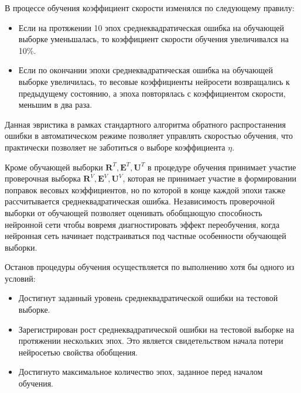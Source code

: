 
В процессе обучения коэффициент скорости изменялся по следующему правилу:
\begin{itemize}
\item Если на протяжении 10 эпох среднеквадратическая ошибка на
  обучающей выборке уменьшалась, то коэффициент скорости обучения
  увеличивался на 10\%.
\item Если по окончании эпохи среднеквадратическая ошибка на обучающей
  выборке увеличилась, то весовые коэффициенты нейросети возвращались
  к предыдущему состоянию, а эпоха повторялась с коэффициентом
  скорости, меньшим в два раза.
\end{itemize}
Данная эвристика в рамках стандартного алгоритма обратного
распростанения ошибки в автоматическом режиме позволяет управлять
скоростью обучения, что практически позволяет не заботиться о выборе
коэффициента $\eta$.

Кроме обучающей выборки $\mathbf{R}^T,\mathbf{E}^T,\mathbf{U}^T$ в
процедуре обучения принимает участие проверочная выборка
$\mathbf{R}^V,\mathbf{E}^V,\mathbf{U}^V$, которая не принимает участие
в формировании поправок весовых коэффициентов, но по которой в конце
каждой эпохи также рассчитывается среднеквадратическая ошибка.
Независимость проверочной выборки от обучающей позволяет оценивать
обобщающую способность нейронной сети чтобы вовремя диагностировать
эффект переобучения, когда нейронная сеть начинает подстраиваться под
частные особенности обучающей выборки.

Останов процедуры обучения осуществляется по выполнению хотя бы одного
из условий:
\begin{itemize}
\item Достигнут заданный уровень среднеквадратической ошибки на
  тестовой выборке.
\item Зарегистрирован рост среднеквадратической ошибки на тестовой
  выборке на протяжении нескольких эпох.  Это является свидетельством
  начала потери нейросетью свойства обобщения.
\item Достигнуто максимальное количество эпох, заданное перед началом
  обучения.
\end{itemize}

